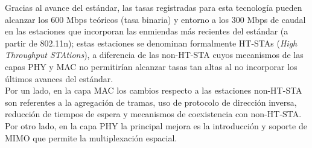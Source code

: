 Gracias al avance del estándar, las tasas registradas para esta tecnología pueden alcanzar los 600 Mbps teóricos (tasa binaria) y entorno a los 300 Mbps de caudal en las estaciones que incorporan las enmiendas más recientes del estándar (a partir de 802.11n); estas estaciones se denominan formalmente HT-STAs (\textit{High Throughput STAtions}), a diferencia de las non-HT-STA cuyos mecanismos de las capas PHY y MAC no permitirían alcanzar tasas tan altas al no incorporar los últimos avances del estándar.\\

Por un lado, en la capa MAC los cambios respecto a las estaciones non-HT-STA son referentes a la agregación de tramas, uso de protocolo de dirección inversa, reducción de tiempos de espera y mecanismos de coexistencia con non-HT-STA. Por otro lado, en la capa PHY la principal mejora es la introducción y soporte de MIMO que permite la multiplexación espacial. \\

